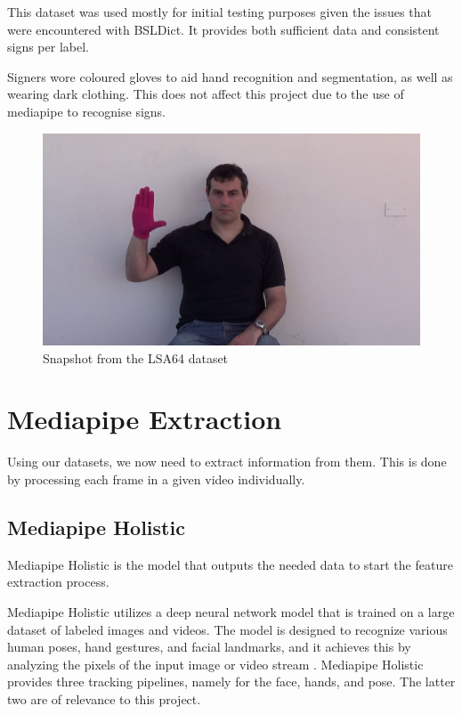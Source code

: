 \documentclass[final,dissertation.tex]{subfiles}
\begin{document}
This dataset was used mostly for initial testing purposes given the issues that were encountered with BSLDict. It provides both sufficient data and consistent signs per label.

Signers wore coloured gloves to aid hand recognition and segmentation, as well as wearing dark clothing. This does not affect this project due to the use of mediapipe to recognise signs.


\begin{figure}
    \begin{center}
        \includegraphics[scale=0.15]{images/LSA64.png}
        \caption[caption]{Snapshot from the LSA64 dataset}
    \end{center}
\end{figure}

\section{Mediapipe Extraction}

Using our datasets, we now need to extract information from them. This is done by processing each frame in a given video individually.

\subsection{Mediapipe Holistic}

Mediapipe Holistic is the model that outputs the needed data to start the feature extraction process.

Mediapipe Holistic utilizes a deep neural network model that is trained on a large dataset of labeled images and videos. The model is designed to recognize various human poses, hand gestures, and facial landmarks, and it achieves this by analyzing the pixels of the input image or video stream \cite{grishchenko_bazarevsky_2020}. Mediapipe Holistic provides three tracking pipelines, namely for the face, hands, and pose. The latter two are of relevance to this project.
\end{document}

